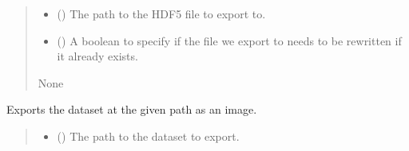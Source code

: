 \documentclass[letterpaper,10pt,english]{sphinxmanual}
\begin{document}
\begin{fulllineitems}
\begin{fulllineitems}
\begin{quote}
\begin{description}
\begin{itemize}
\item {} 
\sphinxAtStartPar
{} () \textendash{} The path to the HDF5 file to export to.

\item {} 
\sphinxAtStartPar
{} () \textendash{} A boolean to specify if the file we export to needs to be rewritten if it already exists.

\end{itemize}

\sphinxAtStartPar
None

\end{description}\end{quote}

\end{fulllineitems}


\begin{fulllineitems}
\label{\detokenize{_autosummary/HDF5_BLS.wrapper:HDF5_BLS.wrapper.Wrapper.export_image}}
\pysigstartsignatures
\pysiglinewithargsret
{}
{\sphinxparamcomma {}\sphinxparamcomma {}\sphinxparamcomma {}\sphinxparamcomma {}\sphinxparamcomma {}\sphinxparamcomma {}\sphinxparamcomma {}\sphinxparamcomma {}\sphinxparamcomma {}}
{}
\pysigstopsignatures
\sphinxAtStartPar
Exports the dataset at the given path as an image.
\begin{quote}\begin{description}
\begin{itemize}
\item {} 
\sphinxAtStartPar
{} () \textendash{} The path to the dataset to export.


\end{itemize}
\end{description}
\end{quote}
\end{fulllineitems}
\end{fulllineitems}
\end{document}
